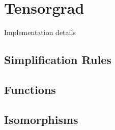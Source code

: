 
\chapter{Tensorgrad}

Implementation details

\section{Simplification Rules}
\section{Functions}
\section{Isomorphisms}
